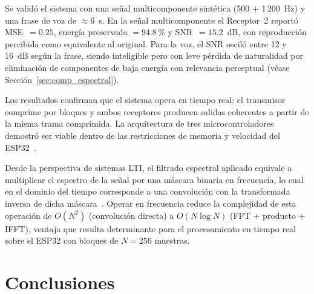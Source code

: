 \documentclass[12pt, journal]{IEEEtran}
\begin{document}
Se validó el sistema con una señal multicomponente sintética (500 + 1\,200~Hz)
y una frase de voz de $\approx$6~s. En la señal multicomponente el Receptor~2
reportó MSE~$= 0.25$, energía preservada $= 94.8\,\%$ y SNR~$= 15.2$~dB, con
reproducción percibida como equivalente al original. Para la voz, el SNR osciló
entre 12 y 16~dB según la frase, siendo inteligible pero con leve pérdida de
naturalidad por eliminación de componentes de baja energía con relevancia
perceptual (véase Sección~\ref{sec:comp_espectral}).

\begin{table}[H]
\centering
\caption{Métricas globales del sistema embebido para ambos tipos de señal}
\label{tab:metricas_sistema}
\end{table}

Los resultados confirman que el sistema opera en tiempo real: el transmisor
comprime por bloques y ambos receptores producen salidas coherentes a partir de
la misma trama comprimida. La arquitectura de tres microcontroladores demostró
ser viable dentro de las restricciones de memoria y velocidad del
ESP32~\cite{esp32datasheet}.

Desde la perspectiva de sistemas LTI, el filtrado espectral aplicado equivale
a multiplicar el espectro de la señal por una máscara binaria en frecuencia,
lo cual en el dominio del tiempo corresponde a una convolución con la
transformada inversa de dicha máscara~\cite{Oppenheim_Willsky_Nawab_1997}.
Operar en frecuencia reduce la complejidad de esta operación de $O(N^2)$
(convolución directa) a $O(N\log N)$ (FFT + producto + IFFT), ventaja que
resulta determinante para el procesamiento en tiempo real sobre el ESP32 con
bloques de $N{=}256$ muestras.

\section{Conclusiones}
\end{document}
